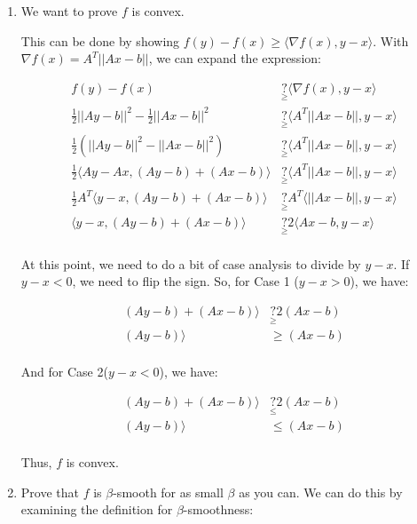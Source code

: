 \documentclass[11pt]{article}
\theoremstyle{definition}
\theoremstyle{case}
\theoremstyle{theorem}
\begin{document}
\begin{enumerate}[label=(\alph*)]

\item We want to prove $f$ is convex. 

This can be done by showing $f(y) - f(x) \geq \langle \nabla f(x), y - x \rangle$. 
With $\nabla f(x) = A^T ||Ax - b||$, we can expand the expression:

\begin{align*}
f(y) - f(x) &\underset{\geq}{?} \langle \nabla f(x), y - x \rangle \\
\frac{1}{2} ||Ay - b||^2 - \frac{1}{2} ||Ax - b||^2 &\underset{\geq}{?} \langle A^T ||Ax - b||, y - x \rangle \\
\frac{1}{2} \left( ||Ay - b||^2 - ||Ax - b||^2 \right) &\underset{\geq}{?} \langle A^T ||Ax - b||, y - x \rangle \\
\frac{1}{2} \langle Ay - Ax, (Ay - b) + (Ax - b) \rangle &\underset{\geq}{?} \langle A^T ||Ax - b||, y - x \rangle \\
\frac{1}{2} A^T \langle y - x, (Ay - b) + (Ax - b) \rangle &\underset{\geq}{?} A^T \langle ||Ax - b||, y - x \rangle \\
\langle y - x, (Ay - b) + (Ax - b) \rangle &\underset{\geq}{?} 2 \langle Ax - b, y - x \rangle \\
\end{align*}

At this point, we need to do a bit of case analysis to divide by $y - x$. If $y - x < 0$, we need to flip the sign. So,
for Case 1 ($y - x > 0$), we have:

\begin{align*}
(Ay - b) + (Ax - b) \rangle &\underset{\geq}{?} 2(Ax - b) \\
(Ay - b) \rangle &\geq (Ax - b) \\
\end{align*}

And for Case 2($y - x < 0$), we have:

\begin{align*}
(Ay - b) + (Ax - b) \rangle &\underset{\leq}{?} 2(Ax - b) \\
(Ay - b) \rangle &\leq (Ax - b) \\
\end{align*}

Thus, $f$ is convex.

\item Prove that $f$ is $\beta$-smooth for as small $\beta$ as you can. We can do this by examining the 
definition for $\beta$-smoothness:


\end{enumerate}
\end{document}
